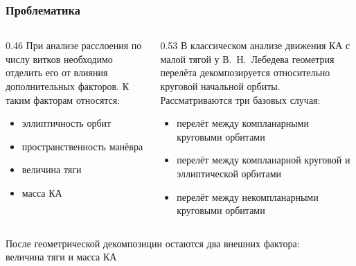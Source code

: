 \begin{frame}[t]
    \frametitle{Проблематика}
    \presentationtextsize
    \begin{columns}[T,onlytextwidth]
        \begin{column}{0.46\textwidth}
            При анализе расслоения по числу витков необходимо отделить его от влияния дополнительных факторов. К таким факторам относятся:
            \begin{itemize}
                \item эллиптичность орбит
                \item пространственность манёвра
                \item величина тяги
                \item масса КА
            \end{itemize}
        \end{column}
        \begin{column}{0.53\textwidth}
            В классическом анализе движения КА с малой тягой у В.~Н.~Лебедева геометрия перелёта декомпозируется относительно круговой начальной орбиты. Рассматриваются три базовых случая:
            \begin{itemize}
                \item перелёт между компланарными круговыми орбитами
                \item перелёт между компланарной круговой и эллиптической орбитами
                \item перелёт между некомпланарными круговыми орбитами
            \end{itemize}
        \end{column}
    \end{columns}
    \vfill
    \begin{lowerbar}
        После геометрической декомпозиции остаются два внешних фактора:\\
        величина тяги и масса КА
    \end{lowerbar}
\end{frame}
